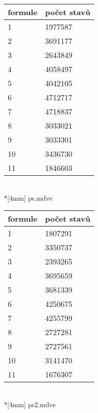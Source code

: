 \documentclass[a4paper]{article}
\begin{document}
\parbox{.4\textwidth}{
\begin{tabular}{|l|l|}
	\hline
	formule	& počet stavů\\ \hline \hline
	1	& 1977587    \\ \hline
	2	& 3691177    \\ \hline
	3	& 2643849    \\ \hline
	4	& 4058497    \\ \hline
	5	& 4042105    \\ \hline
	6	& 4712717    \\ \hline
	7	& 4718837    \\ \hline
	8	& 3033021    \\ \hline
	9	& 3033301    \\ \hline
	10	& 3436730    \\ \hline
	11	& 1846603    \\ \hline
\end{tabular}\\*[4mm]
\centering ps.mdve
}
\hspace{1cm}
\parbox{.4\textwidth}{
\begin{tabular}{|l|l|}
	\hline
	formule	& počet stavů\\ \hline \hline
	1	& 1807291   \\ \hline
	2	& 3350737   \\ \hline
	3	& 2393265   \\ \hline
	4	& 3695659   \\ \hline
	5	& 3681339   \\ \hline 
	6	& 4250675     \\ \hline
	7	& 4255799	     \\ \hline
	8	& 2727281	     \\ \hline
	9	& 2727561	     \\ \hline
	10	& 3141470	     \\ \hline
	11	& 1676307	     \\ \hline
\end{tabular}\\*[4mm]
\centering ps2.mdve
}
\end{document}

